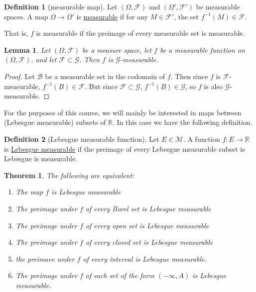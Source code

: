 \documentclass[a4paper]{scrartcl}
\newcommand{\R}{\mathbb{R}}
\newcommand{\defn}[1]{\ul{#1}}
\theoremstyle{definition}
\newtheorem{definition}{Definition}[section]
\theoremstyle{plain}
\newtheorem{theorem}{Theorem}[section]
\newtheorem{lemma}{Lemma}[section]
\theoremstyle{remark}
\begin{document}
\begin{definition}[measurable map]
  \label{def:measurablefunction}
  Let $(\Omega, \mathcal{F})$ and $(\Omega', \mathcal{F}')$ be measurable spaces. A map $\Omega \to \Omega'$ is \defn{measurable} if for any $M \in \mathcal{F}'$, the set $f^{-1}(M) \in \mathcal{F}$.

  That is, $f$ is measurable if the preimage of every measurable set is measurable.
\end{definition}

\begin{lemma}
  \label{lemma:functionalsomeasurablewithrespecttobiggersigmaalgebra}
  Let $(\Omega, \mathcal{F})$ be a measure space, let $f$ be a measurable function on $(\Omega, \mathcal{F})$, and let $\mathcal{F} \subset \mathcal{G}$. Then $f$ is $\mathcal{G}$-measurable.
\end{lemma}
\begin{proof}
  Let $\mathcal{B}$ be a measurable set in the codomain of $f$. Then since $f$ is $\mathcal{F}$-measurable, $f^{-1}(B) \in \mathcal{F}$. But since $\mathcal{F} \subset \mathcal{G}$, $f^{-1}(B) \in \mathcal{G}$, so $f$ is also $\mathcal{G}$-measurable.
\end{proof}

For the purposes of this course, we will mainly be interested in maps between (Lebesgue measurable) subsets of $\R$. In this case we have the following definition.
\begin{definition}[Lebesgue measurable function]
  \label{def:lebesguemeasurablefunction}
  Let $E \in \mathcal{M}$. A function $f\colon E \to \R$ is \defn{Lebesgue measurable} if the preimage of every Lebesgue measurable subset is Lebesgue is measurable.
\end{definition}

\begin{theorem}
  The following are equivalent:
  \begin{enumerate}
    \item The map $f$ is Lebesgue measurable

    \item The preimage under $f$ of every Borel set is Lebesgue measurable

    \item The preimage under $f$ of every open set is Lebesgue measurable

    \item The preimage under $f$ of every closed set is Lebesgue measurable

    \item the preimave under $f$ of every interval is Lebesgue measurable.

    \item The preimage under $f$ of each set of the form $(-\infty, A)$ is Lebesgue measurable.
  \end{enumerate}
\end{theorem}
\end{document}
